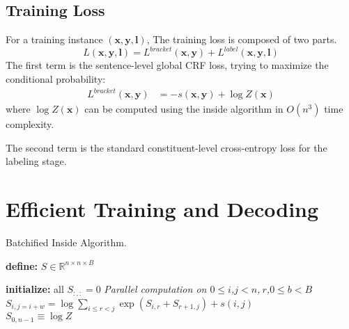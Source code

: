 \documentclass{article}
\begin{document}
\subsection{Training Loss}

For a training instance $(\boldsymbol{x}, \boldsymbol{y}, \boldsymbol{l})$, The training loss is composed of two parts.
\begin{equation} \label{equation:final-loss}
\mathit{L(\boldsymbol{x}, \boldsymbol{y}, \boldsymbol{l})} = \mathit{L}^{bracket}(\boldsymbol{x}, \boldsymbol{y}) + \mathit{L}^{label}(\boldsymbol{x}, \boldsymbol{y}, \boldsymbol{l})
\end{equation}
The first term is the sentence-level global CRF loss, trying to maximize the conditional probability:
\begin{equation}\label{equation:bracket-loss}
\begin{split}
\mathit{L}^{bracket}(\boldsymbol{x},\boldsymbol{y})
&= -s(\boldsymbol{x}, \boldsymbol{y}) + \log Z(\boldsymbol{x})
\end{split}
\end{equation}
where $\log Z(\boldsymbol{x})$ can be computed using the inside algorithm in $O(n^3)$ time complexity.

The second term is the standard constituent-level cross-entropy loss for the labeling stage.








 
\section{Efficient Training and Decoding}
\label{section:efficient-training-decoding}

\begin{algorithm}[tb]
\caption{Batchified Inside Algorithm.}
\begin{algorithmic}[1]
\newlength{\commentindent}
\setlength{\commentindent}{.2\textwidth}
\renewcommand{\algorithmiccomment}[1]{\unskip\hfill\makebox[\commentindent][l]{$\rhd$~#1}\par}
\LetLtxMacro{\oldalgorithmic}{\algorithmic}
\renewcommand{\algorithmic}[1][0]{\oldalgorithmic[#1]\renewcommand{\ALC@com}[1]{\ifnum\pdfstrcmp{##1}{default}=0\else\algorithmiccomment{##1}\fi}}
\STATE \textbf{define:} $S \in \mathbb{R}^{n \times n \times B}$ 


\STATE \textbf{initialize:} all $S_{:, :} = 0$
\STATE \emph{Parallel computation on $0 \le i$,$j<n$,$~r$,$0\le b<B$}
\STATE $S_{i, j=i+w} = \log \sum\limits_{i \le r < j} \exp \left( S_{i, r}+S_{r+1, j} \right)  + s(i, j) $ \label{line:sum-product}\\
\ENDFOR
\RETURN $S_{0, n-1} \equiv \log Z$
\end{algorithmic}
\label{alg:inside}
\end{algorithm}
 
\end{document}
